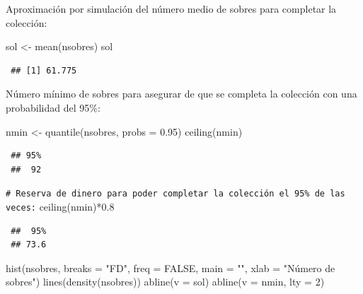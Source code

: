 \documentclass[
  10pt,
]{book}
\newenvironment{Shaded}{\begin{snugshade}}{\end{snugshade}}
\newcommand{\AttributeTok}[1]{\textcolor[rgb]{0.77,0.63,0.00}{#1}}
\newcommand{\CommentTok}[1]{\textcolor[rgb]{0.56,0.35,0.01}{\textit{#1}}}
\newcommand{\ConstantTok}[1]{\textcolor[rgb]{0.00,0.00,0.00}{#1}}
\newcommand{\DecValTok}[1]{\textcolor[rgb]{0.00,0.00,0.81}{#1}}
\newcommand{\FloatTok}[1]{\textcolor[rgb]{0.00,0.00,0.81}{#1}}
\newcommand{\FunctionTok}[1]{\textcolor[rgb]{0.00,0.00,0.00}{#1}}
\newcommand{\NormalTok}[1]{#1}
\newcommand{\OtherTok}[1]{\textcolor[rgb]{0.56,0.35,0.01}{#1}}
\newcommand{\SpecialCharTok}[1]{\textcolor[rgb]{0.00,0.00,0.00}{#1}}
\newcommand{\StringTok}[1]{\textcolor[rgb]{0.31,0.60,0.02}{#1}}
\theoremstyle{break}
\theoremstyle{nonumberplain}
\renewcommand{\CommentTok}[1]{\textcolor[rgb]{0.41,0.41,0.41}{\texttt{#1}}}
\begin{document}
Aproximación por simulación del número medio de sobres para completar la colección:

\begin{Shaded}
\begin{Highlighting}[]
\NormalTok{sol }\OtherTok{\textless{}{-}} \FunctionTok{mean}\NormalTok{(nsobres)}
\NormalTok{sol}
\end{Highlighting}
\end{Shaded}

\begin{verbatim}
 ## [1] 61.775
\end{verbatim}

Número mínimo de sobres para asegurar de que se completa la colección con una probabilidad del 95\%:

\begin{Shaded}
\begin{Highlighting}[]
\NormalTok{nmin }\OtherTok{\textless{}{-}} \FunctionTok{quantile}\NormalTok{(nsobres, }\AttributeTok{probs =} \FloatTok{0.95}\NormalTok{)}
\FunctionTok{ceiling}\NormalTok{(nmin)}
\end{Highlighting}
\end{Shaded}

\begin{verbatim}
 ## 95% 
 ##  92
\end{verbatim}

\begin{Shaded}
\begin{Highlighting}[]
\CommentTok{\# Reserva de dinero para poder completar la colección el 95\% de las veces:}
\FunctionTok{ceiling}\NormalTok{(nmin)}\SpecialCharTok{*}\FloatTok{0.8}
\end{Highlighting}
\end{Shaded}

\begin{verbatim}
 ##  95% 
 ## 73.6
\end{verbatim}

\begin{Shaded}
\begin{Highlighting}[]
\FunctionTok{hist}\NormalTok{(nsobres, }\AttributeTok{breaks =} \StringTok{"FD"}\NormalTok{, }\AttributeTok{freq =} \ConstantTok{FALSE}\NormalTok{,}
     \AttributeTok{main =} \StringTok{""}\NormalTok{, }\AttributeTok{xlab =} \StringTok{"Número de sobres"}\NormalTok{)}
\FunctionTok{lines}\NormalTok{(}\FunctionTok{density}\NormalTok{(nsobres))}
\FunctionTok{abline}\NormalTok{(}\AttributeTok{v =}\NormalTok{ sol)}
\FunctionTok{abline}\NormalTok{(}\AttributeTok{v =}\NormalTok{ nmin, }\AttributeTok{lty =} \DecValTok{2}\NormalTok{)}
\end{Highlighting}
\end{Shaded}
\end{document}
